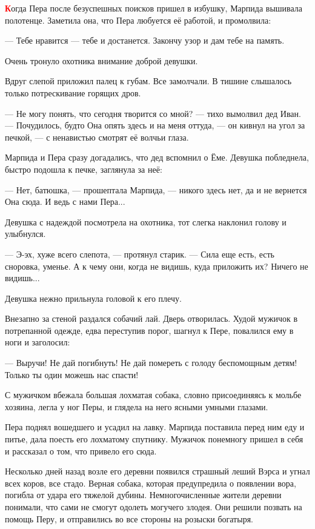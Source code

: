 \documentclass[oneside,final,14pt]{extreport}
\begin{document}
	\lettrine[findent=0pt]{\textbf{\textcolor{red}{К}}}{}огда Пера после безуспешных поисков пришел в избушку, Марпида вышивала полотенце. Заметила она, что Пера любуется её работой, и промолвила:
	
	— Тебе нравится — тебе и достанется. Закончу узор и дам тебе на память.
	
	Очень тронуло охотника внимание доброй девушки.
	
	Вдруг слепой приложил палец к губам. Все замолчали. В тишине слышалось только потрескивание горящих дров.
	
	— Не могу понять, что сегодня творится со мной? — тихо вымолвил дед Иван. — Почудилось, будто Она опять здесь и на меня оттуда, — он кивнул на угол за печкой, — с ненавистью смотрят её волчьи глаза.
	
	Марпида и Пера сразу догадались, что дед вспомнил о Ёме. Девушка побледнела, быстро подошла к печке, заглянула за неё:
	
	— Нет, батюшка, — прошептала Марпида, — никого здесь нет, да и не вернется Она сюда. И ведь с нами Пера...
	
	Девушка с надеждой посмотрела на охотника, тот слегка наклонил голову и улыбнулся.
	
	— Э-эх, хуже всего слепота, — протянул старик. — Сила еще есть, есть сноровка, уменье. А к чему они, когда не видишь, куда приложить их? Ничего не видишь...
	
	Девушка нежно прильнула головой к его плечу.
	
	Внезапно за стеной раздался собачий лай. Дверь отворилась. Худой мужичок в потрепанной одежде, едва переступив порог, шагнул к Пере, повалился ему в ноги и заголосил:
	
	— Выручи! Не дай погибнуть! Не дай помереть с голоду беспомощным детям! Только ты один можешь нас спасти!
	
	С мужичком вбежала большая лохматая собака, словно присоединяясь к мольбе хозяина, легла у ног Перы, и глядела на него ясными умными глазами.
	
	Пера поднял вошедшего и усадил на лавку. Марпида поставила перед ним еду и питье, дала поесть его лохматому спутнику. Мужичок понемногу пришел в себя и рассказал о том, что привело его сюда.
	
	Несколько дней назад возле его деревни появился страшный леший Вэрса и угнал всех коров, все стадо. Верная собака, которая предупредила о появлении вора, погибла от удара его тяжелой дубины. Немногочисленные жители деревни понимали, что сами не смогут одолеть могучего злодея. Они решили позвать на помощь Перу, и отправились во все стороны на розыски богатыря.
	
\end{document}

